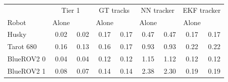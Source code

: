 \begin{tabular}{lcccccccc}
\toprule
 & \multicolumn{2}{c}{Tier 1} & \multicolumn{2}{c}{GT tracks} & \multicolumn{2}{c}{NN tracker} & \multicolumn{2}{c}{EKF tracker} \\
Robot & Alone & \avatar{} & Alone & \avatar{} & Alone & \avatar{} & Alone & \avatar{} \\
\midrule
Husky & 0.02 & 0.02 & 0.17 & 0.17 & 0.47 & 0.47 & 0.17 & 0.17 \\
Tarot 680 & 0.16 & 0.13 & 0.16 & 0.17 & 0.93 & 0.93 & 0.22 & 0.22 \\
BlueROV2 0 & 0.04 & 0.04 & 0.12 & 0.12 & 1.15 & 1.12 & 0.12 & 0.12 \\
BlueROV2 1 & 0.08 & 0.07 & 0.14 & 0.14 & 2.38 & 2.30 & 0.19 & 0.19 \\
\bottomrule
\end{tabular}
